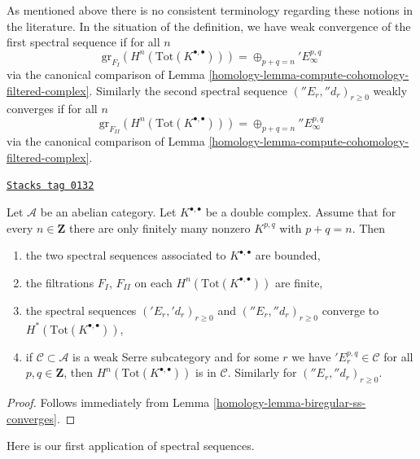 As mentioned above there is no consistent terminology regarding these
notions in the literature. In the situation of the definition, we have
weak convergence of the first spectral sequence if for all $n$
$$
\text{gr}_{F_I}(H^n(\text{Tot}(K^{\bullet, \bullet}))) =
\oplus_{p + q = n} {}'E_\infty^{p, q}
$$
via the canonical comparison of
Lemma \ref{homology-lemma-compute-cohomology-filtered-complex}.
Similarly the second spectral sequence $({}''E_r, {}''d_r)_{r \geq 0}$
weakly converges if for all $n$
$$
\text{gr}_{F_{II}}(H^n(\text{Tot}(K^{\bullet, \bullet}))) =
\oplus_{p + q = n} {}''E_\infty^{p, q}
$$
via the canonical comparison of
Lemma \ref{homology-lemma-compute-cohomology-filtered-complex}.

\begin{lemma}
\label{homology-lemma-first-quadrant-ss}
\href{https://stacks.math.columbia.edu/tag/0132}{\texttt{Stacks tag 0132}}

Let $\mathcal{A}$ be an abelian category. Let $K^{\bullet, \bullet}$
be a double complex. Assume that for every $n \in \mathbf{Z}$ there are
only finitely many nonzero $K^{p, q}$ with $p + q = n$. Then
\begin{enumerate}
\item the two spectral sequences associated to $K^{\bullet, \bullet}$
are bounded,
\item the filtrations $F_I$, $F_{II}$ on each
$H^n(\text{Tot}(K^{\bullet, \bullet}))$ are finite,
\item the spectral sequences $({}'E_r, {}'d_r)_{r \geq 0}$ and
$({}''E_r, {}''d_r)_{r \geq 0}$ converge to
$H^*(\text{Tot}(K^{\bullet, \bullet}))$,
\item if $\mathcal{C} \subset \mathcal{A}$ is a weak Serre subcategory
and for some $r$ we have ${}'E_r^{p, q} \in \mathcal{C}$ for all
$p, q \in \mathbf{Z}$, then $H^n(\text{Tot}(K^{\bullet, \bullet}))$
is in $\mathcal{C}$. Similarly for $({}''E_r, {}''d_r)_{r \geq 0}$.
\end{enumerate}
\end{lemma}

\begin{proof}

Follows immediately from Lemma \ref{homology-lemma-biregular-ss-converges}.
\end{proof}

Here is our first application of spectral sequences.

